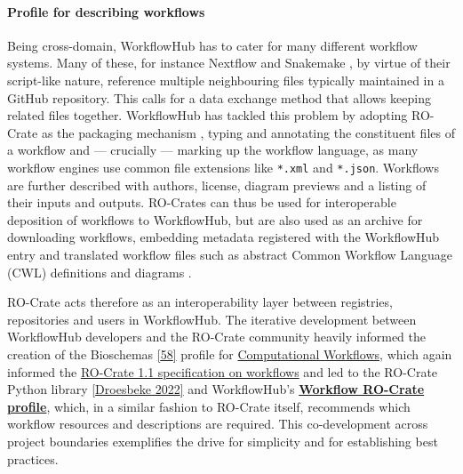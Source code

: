 {\hypertarget{profile-for-describing-workflows}{%
\paragraph{Profile for describing
workflows}\label{profile-for-describing-workflows}}

Being cross-domain, WorkflowHub has to cater for many different workflow
systems. Many of these, for instance Nextflow
\cite{Di Tommaso 2017} and Snakemake
\cite{ch5-73}, by
virtue of their script-like nature, reference multiple neighbouring
files typically maintained in a GitHub repository. This calls for a data
exchange method that allows keeping related files together. WorkflowHub
has tackled this problem by adopting RO-Crate as the packaging mechanism
\cite{Bietrix 2021}, typing and
annotating the constituent files of a workflow and --- crucially ---
marking up the workflow language, as many workflow engines use common
file extensions like \texttt{*.xml} and \texttt{*.json}. Workflows are
further described with authors, license, diagram previews and a listing
of their inputs and outputs. RO-Crates can thus be used for
interoperable deposition of workflows to WorkflowHub, but are also used
as an archive for downloading workflows, embedding metadata registered
with the WorkflowHub entry and translated workflow files such as
abstract Common Workflow Language (CWL)
\cite{Crusoe 2022} definitions and
diagrams \cite{ch5-56}.

RO-Crate acts therefore as an interoperability layer between registries,
repositories and users in WorkflowHub. The iterative development between
WorkflowHub developers and the RO-Crate community heavily informed the
creation of the Bioschemas
\href{https://iswc2017.semanticweb.org/paper-579/}{{[}58{]}} profile for
\href{https://bioschemas.org/profiles/ComputationalWorkflow/1.0-RELEASE/}{Computational
Workflows}, which again informed the
\href{https://www.researchobject.org/ro-crate/1.1/workflows.html}{RO-Crate
1.1 specification on workflows} and led to the RO-Crate Python library
\href{https://doi.org/10.5281/zenodo.3956493}{{[}Droesbeke 2022{]}} and
WorkflowHub's
\href{https://w3id.org/workflowhub/workflow-ro-crate/1.0}{\textbf{Workflow
RO-Crate profile}}, which, in a similar fashion to RO-Crate itself,
recommends which workflow resources and descriptions are required. This
co-development across project boundaries exemplifies the drive for
simplicity and for establishing best practices.

\hypertarget{profile-for-recording-workflow-runs}{%
}}
